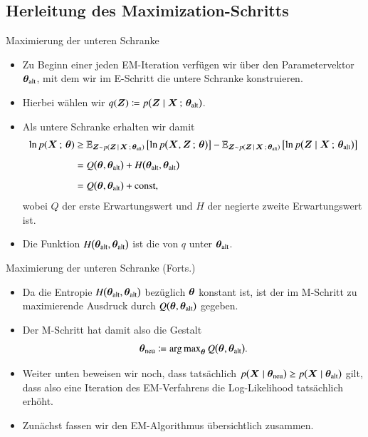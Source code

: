 \subsection{Herleitung des Maximization-Schritts}

\begin{frame}{Maximierung der unteren Schranke}{}
	\begin{itemize}
		\item Zu Beginn einer jeden EM-Iteration verfügen wir über den Parametervektor $\bm{\theta}_{\text{alt}}$, mit dem wir im E-Schritt
			die untere Schranke konstruieren.
		\item Hierbei wählen wir $q(\bm{Z}) \coloneqq p\bigl( \bm{Z} \mid \bm{X} \,;\, \bm{\theta}_{\text{alt}} \bigr)$.
		\item Als untere Schranke erhalten wir damit
		\begin{align*}
			\ln p(\bm{X} \,;\, \bm{\theta})
				&\ge \mathbb{E}_{\bm{Z} \sim p(\bm{Z}\,\mid\,\bm{X} \,;\, \bm{\theta}_{\text{alt}})}\left[ \ln p\bigl( \bm{X}, \bm{Z} \,;\, \bm{\theta} \bigr) \right]
					- \mathbb{E}_{\bm{Z} \sim p(\bm{Z}\,\mid\,\bm{X} \,;\, \bm{\theta}_{\text{alt}})}\left[ \ln p\bigl( \bm{Z} \mid \bm{X} \,;\, \bm{\theta}_{\text{alt}} \bigr) \right]
		\\[2mm]
				&= Q\bigl( \bm{\theta}, \bm{\theta}_{\text{alt}} \bigr) + H\bigl( \bm{\theta}_{\text{alt}}, \bm{\theta}_{\text{alt}} \bigr)
		\\[2mm]
				&= Q\bigl( \bm{\theta}, \bm{\theta}_{\text{alt}} \bigr) + \text{const},
		\end{align*}
			wobei $Q$ der erste Erwartungswert und $H$ der negierte zweite Erwartungswert ist.
		\item Die Funktion $H\bigl( \bm{\theta}_{\text{alt}}, \bm{\theta}_{\text{alt}} \bigr)$ ist die  von $q$ unter $\bm{\theta}_{\text{alt}}$.
	\end{itemize}
\end{frame}


\begin{frame}{Maximierung der unteren Schranke (Forts.)}{}
	\begin{itemize}
		\item Da die Entropie $H\bigl( \bm{\theta}_{\text{alt}}, \bm{\theta}_{\text{alt}} \bigr)$ bezüglich $\bm{\theta}$ konstant ist, ist der im M-Schritt zu maximierende
			Ausdruck durch $Q\bigl( \bm{\theta}, \bm{\theta}_{\text{alt}} \bigr)$ gegeben.
		\item Der M-Schritt hat damit also die Gestalt
		\begin{equation} \label{eq:em-m-step}
			\bm{\theta}_{\text{neu}} \coloneqq \operatorname{arg\,max}_{\bm{\theta}} Q\bigl( \bm{\theta}, \bm{\theta}_{\text{alt}} \bigr).
		\end{equation}
		\item Weiter unten beweisen wir noch, dass tatsächlich $p\bigl(\bm{X} \mid \bm{\theta}_{\text{neu}} \bigr) \ge p\bigl(\bm{X} \mid \bm{\theta}_{\text{alt}} \bigr)$ gilt,
			dass also eine Iteration des EM-Verfahrens die Log-Likelihood tatsächlich erhöht.
		\item Zunächst fassen wir den EM-Algorithmus übersichtlich zusammen.
	\end{itemize}
\end{frame}


